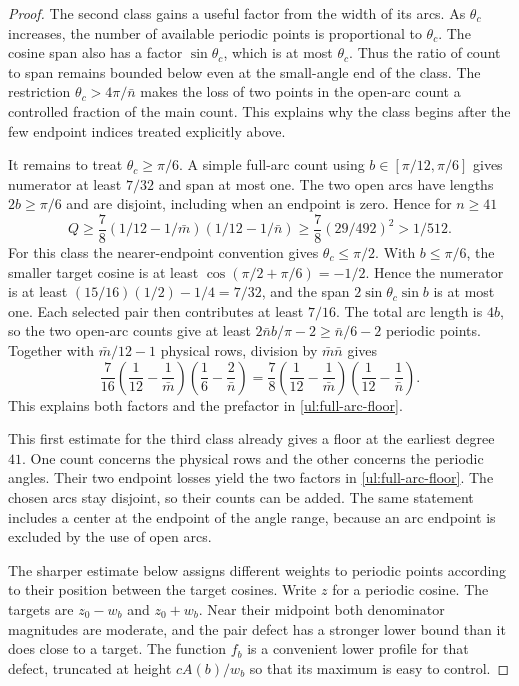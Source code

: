 \begin{proof}
The second class gains a useful factor from the width of its arcs.
As $\theta_c$ increases, the number of available periodic points is
proportional to $\theta_c$.  The cosine span also has a factor
$\sin\theta_c$, which is at most $\theta_c$.  Thus the ratio of count
to span remains bounded below even at the small-angle end of the
class.  The restriction $\theta_c>4\pi/\bar{n}$ makes the loss of two
points in the open-arc count a controlled fraction of the main
count.  This explains why the class begins after the few endpoint
indices treated explicitly above.

It remains to treat $\theta_c\geq\pi/6$.  A simple full-arc count using
$b\in[\pi/12,\pi/6]$ gives numerator at least $7/32$ and span at most
one.  The two open arcs have lengths $2b\geq\pi/6$ and are disjoint,
including when an endpoint is zero.  Hence for $n\geq41$
\begin{equation}\label{ul:full-arc-floor}
 Q\geq\frac78(1/12-1/\bar{m})(1/12-1/\bar{n})
 \geq\frac78(29/492)^2>1/512.
\end{equation}
For this class the nearer-endpoint convention gives
$\theta_c\leq\pi/2$.  With $b\leq\pi/6$, the smaller target
cosine is at least $\cos(\pi/2+\pi/6)=-1/2$.  Hence the
numerator is at least $(15/16)(1/2)-1/4=7/32$, and the span
$2\sin\theta_c\sin b$ is at most one.  Each selected pair then
contributes at least $7/16$.  The total arc length is $4b$, so
the two open-arc counts give at least
$2\bar{n}b/\pi-2\geq \bar{n}/6-2$ periodic points.  Together with
$\bar{m}/12-1$ physical rows, division by $\bar{m}\bar{n}$ gives
\[
 \frac{7}{16}\left(\frac1{12}-\frac{1}{\bar{m}}\right)
                  \left(\frac16-\frac{2}{\bar{n}}\right)
 =\frac78\left(\frac1{12}-\frac{1}{\bar{m}}\right)
                  \left(\frac1{12}-\frac{1}{\bar{n}}\right).
\]
This explains both factors and the prefactor in
\eqref{ul:full-arc-floor}.

This first estimate for the third class already gives a floor at
the earliest degree $41$.  One count concerns the physical rows
and the other concerns the periodic angles.  Their two endpoint
losses yield the two factors in \eqref{ul:full-arc-floor}.
The chosen arcs stay disjoint, so their counts can be added.  The
same statement includes a center at the endpoint of the angle
range, because an arc endpoint is excluded by the use of open arcs.

The sharper estimate below assigns different weights to periodic
points according to their position between the target cosines.
Write $z$ for a periodic cosine.  The targets are $z_0-w_b$ and
$z_0+w_b$.  Near their midpoint both denominator magnitudes are
moderate, and the pair defect has a stronger lower bound than it
does close to a target.  The function $f_b$ is a convenient lower
profile for that defect, truncated at height $cA(b)/w_b$ so that
its maximum is easy to control.


\end{proof}
